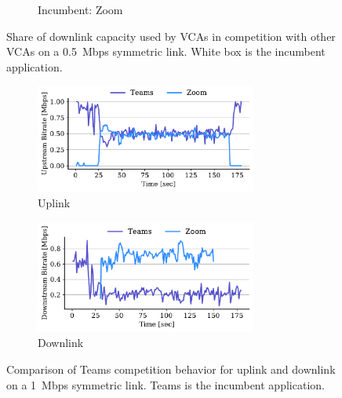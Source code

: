 \begin{figure}[t!]
\begin{subfigure}[t]{.33\textwidth}
    \caption{Incumbent: Zoom}
    \label{fig:zoom-dl-boxplot-0.5}
\end{subfigure}
\caption{Share of downlink capacity used by VCAs in competition with other VCAs on a 0.5~Mbps symmetric link. White box is the incumbent application.}
\label{fig:dnld-boxplot}
\end{figure}

\begin{figure}[t!]
\centering
\begin{subfigure}[t]{.5\textwidth}
    \centering
    \includegraphics[width=0.8\textwidth]{figures/comp_ts/teams_zoom_1_ul_r2.pdf}
    \caption{Uplink}
    \label{fig:teams-zoom-up-1}
\end{subfigure}\hfill
\begin{subfigure}[t]{.5\textwidth}
    \centering
    \includegraphics[width=0.8\textwidth]{figures/comp_ts/teams_zoom_1_dl_r2.pdf}
    \caption{Downlink}
    \label{fig:teams-zoom-down-1}
\end{subfigure}
\caption{Comparison of Teams competition behavior for uplink and downlink on a 1~Mbps symmetric link. Teams is the incumbent application.}
\label{fig:teams-zoom-1}
\end{figure}


